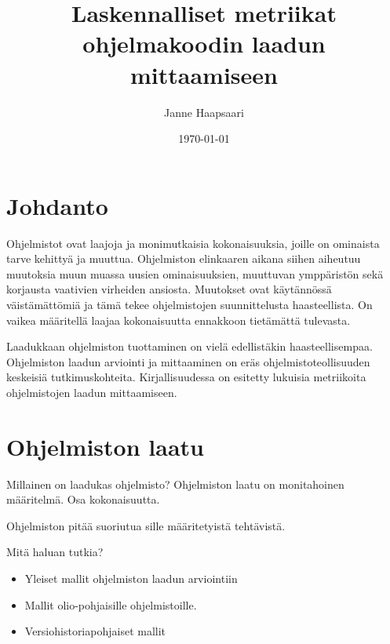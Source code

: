\documentclass[finnish]{tktltiki2}
\title{Laskennalliset metriikat ohjelmakoodin laadun mittaamiseen}
\author{Janne Haapsaari}
\date{\today}
\theoremstyle{definition}
\theoremstyle{remark}
\begin{document}

\frontmatter      %

\maketitle        %

\tableofcontents  %


\mainmatter       %

\section{Johdanto}

Ohjelmistot ovat laajoja ja monimutkaisia kokonaisuuksia, joille on ominaista tarve kehittyä ja muuttua. Ohjelmiston elinkaaren aikana siihen aiheutuu muutoksia muun muassa uusien ominaisuuksien, muuttuvan ymppäristön sekä korjausta vaativien virheiden ansiosta. Muutokset ovat käytännössä väistämättömiä ja tämä tekee ohjelmistojen suunnittelusta haasteellista. On vaikea määritellä laajaa kokonaisuutta ennakkoon tietämättä tulevasta.

Laadukkaan ohjelmiston tuottaminen on vielä edellistäkin haasteellisempaa. Ohjelmiston laadun arviointi ja mittaaminen on eräs ohjelmistoteollisuuden keskeisiä tutkimuskohteita. Kirjallisuudessa on esitetty lukuisia metriikoita ohjelmistojen laadun mittaamiseen.


\section{Ohjelmiston laatu}

Millainen on laadukas ohjelmisto? Ohjelmiston laatu on monitahoinen määritelmä. Osa kokonaisuutta.

Ohjelmiston pitää suoriutua sille määritetyistä tehtävistä.

Mitä haluan tutkia?

\begin{itemize}
  \item Yleiset mallit ohjelmiston laadun arviointiin
  \item Mallit olio-pohjaisille ohjelmistoille.
  \item Versiohistoriapohjaiset mallit
\end{itemize}
\end{document}
